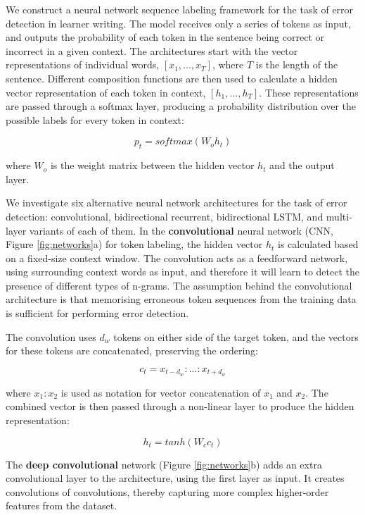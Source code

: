 \documentclass[11pt]{article}
\begin{document}
We construct a neural network sequence labeling framework for the task of error detection in learner writing.
The model receives only a series of tokens as input, and outputs the probability of each token in the sentence being correct or incorrect in a given context.
The architectures start with the vector representations of individual words, $[x_1, ... , x_T]$, where $T$ is the length of the sentence. 
Different composition functions are then used to calculate a hidden vector representation of each token in context, $[h_1, ..., h_T]$.
These representations are passed through a softmax layer, producing a probability distribution over the possible labels for every token in context:

\begin{equation}
p_t = softmax(W_o h_t)
\end{equation}

\noindent where $W_o$ is the weight matrix between the hidden vector $h_t$ and the output layer. 

We investigate six alternative neural network architectures for the task of error detection: convolutional, bidirectional recurrent, bidirectional LSTM, and multi-layer variants of each of them.
In the \textbf{convolutional} neural network (CNN, Figure \ref{fig:networks}a) for token labeling, the hidden vector $h_t$ is calculated based on a fixed-size context window.
The convolution acts as a feedforward network, using surrounding context words as input, and therefore it will learn to detect the presence of different types of n-grams.
The assumption behind the convolutional architecture is that memorising erroneous token sequences from the training data is sufficient for performing error detection. 

The convolution uses $d_w$ tokens on either side of the target token, and the vectors for these tokens are concatenated, preserving the ordering:

\begin{equation}
c_t = x_{t-d_w} : ... : x_{t+d_w}
\end{equation}

\noindent where $x_1:x_2$ is used as notation for vector concatenation of $x_1$ and $x_2$.
The combined vector is then passed through a non-linear layer to produce the hidden representation:

\begin{equation}
h_t = tanh(W_c  c_t)
\end{equation}

The \textbf{deep convolutional} network (Figure \ref{fig:networks}b) adds an extra convolutional layer to the architecture, using the first layer as input. It creates convolutions of convolutions, thereby capturing more complex higher-order features from the dataset.
\end{document}
